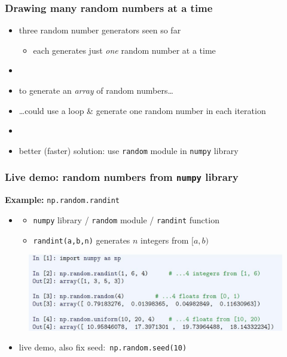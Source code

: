 \documentclass[14pt]{beamer}
\begin{document}

\begin{frame}[fragile]

\frametitle{Drawing \textbf{many} random numbers at a time}

\begin{itemize}
	\item three random number generators seen so far
	\begin{itemize}
		\item each generates just \emph{one} random number at a time
	\end{itemize}
	\item[]
	\item to generate an \emph{array} of random numbers\ldots
	\item[] \ldots could use a loop \& generate one random number in each iteration
	\item[]
	\item better (faster) solution: use \texttt{random} module in \texttt{numpy} library

\end{itemize}

\end{frame}


\begin{frame}[fragile]

\frametitle{Live demo: random numbers from \texttt{numpy} library}

\textbf{Example:} \texttt{np.random.randint}

\begin{itemize}
	\item[]
	\begin{itemize}
		\item \texttt{numpy} library / \texttt{random} module / \texttt{randint} function
		\item \texttt{randint(a,b,n)} generates $n$ integers from $[a,b)$
	\end{itemize}
\end{itemize}

\begin{figure}[ht]
	\centering
	\includegraphics[width=\textwidth]{figures/LLp55b}
\end{figure}

\begin{itemize}
	\item live demo, also fix seed:~\texttt{np.random.seed(10)}
\end{itemize}

\end{frame}
\end{document}
